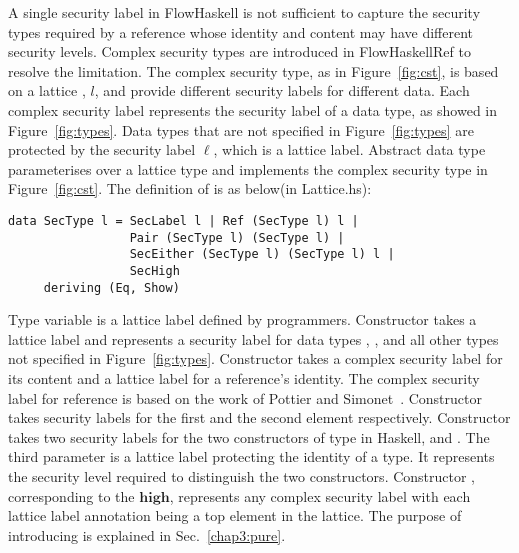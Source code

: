 A single security label in FlowHaskell is not sufficient to capture the security types required
by a reference whose identity and content may have different security levels.
Complex security types are introduced in FlowHaskellRef to resolve the limitation.
The complex security type, as in Figure~\ref{fig:cst}, is based on a lattice
, $l$, and provide different security labels for different data.
Each complex security label represents the security label of a data type, as
showed in Figure~\ref{fig:types}.
Data types that are not specified in Figure~\ref{fig:types} are protected by the security 
label $\ell$, which is a lattice label.
Abstract data type  parameterises over a 
lattice type and implements the complex security type in Figure~\ref{fig:cst}.
The definition of  is as below(in Lattice.hs):
\begin{verbatim}
data SecType l = SecLabel l | Ref (SecType l) l | 
                 Pair (SecType l) (SecType l) |
                 SecEither (SecType l) (SecType l) l |
                 SecHigh  
     deriving (Eq, Show)
\end{verbatim}
Type variable  is a lattice label defined by programmers.
Constructor  takes a lattice label and represents a security
label for data types , , and all other types not
specified in Figure~\ref{fig:types}. 
Constructor  takes a complex security label for its content and
a lattice label for a reference's identity. The complex security label
for reference is based on the work of Pottier and Simonet~\cite{Pottier:Simonet:POPL02}.
Constructor  takes security labels for the first and the 
second element respectively. 
Constructor  takes two security labels for the two constructors
of  type in Haskell,  and . The third parameter
is a lattice label protecting the identity of a  type. It represents
the security level required to distinguish the two constructors.
Constructor , corresponding to the $\mathbf{high}$, represents any 
complex security label with each lattice
label annotation being a top element in the lattice. The purpose of introducing
 is explained in Sec.~\ref{chap3:pure}.

